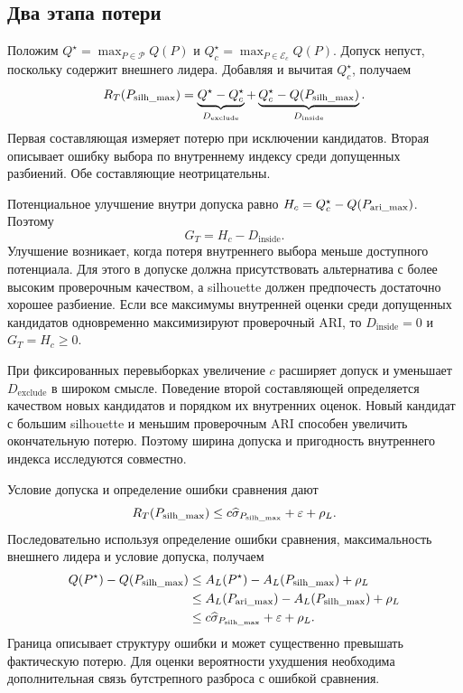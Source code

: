 \subsection{Два этапа потери}
Положим $Q^\star=\max_{P\in\mathcal P}Q(P)$ и $Q_c^\star=\max_{P\in\mathcal E_c}Q(P)$. Допуск непуст, поскольку содержит внешнего лидера. Добавляя и вычитая $Q_c^\star$, получаем
\begin{equation}\label{eq:regret-decomposition}
 R_T(P_{\mathrm{silh\_max}})=
 \underbrace{Q^\star-Q_c^\star}_{D_{\mathrm{exclude}}}
 +\underbrace{Q_c^\star-Q(P_{\mathrm{silh\_max}})}_{D_{\mathrm{inside}}}.
\end{equation}
Первая составляющая измеряет потерю при исключении кандидатов. Вторая описывает ошибку выбора по внутреннему индексу среди допущенных разбиений. Обе составляющие неотрицательны.

Потенциальное улучшение внутри допуска равно $H_c=Q_c^\star-Q(P_{\mathrm{ari\_max}})$. Поэтому
\begin{equation}\label{eq:gain-decomposition}
 G_T=H_c-D_{\mathrm{inside}}.
\end{equation}
Улучшение возникает, когда потеря внутреннего выбора меньше доступного потенциала. Для этого в допуске должна присутствовать альтернатива с более высоким проверочным качеством, а silhouette должен предпочесть достаточно хорошее разбиение. Если все максимумы внутренней оценки среди допущенных кандидатов одновременно максимизируют проверочный ARI, то $D_{\mathrm{inside}}=0$ и $G_T=H_c\ge0$.

При фиксированных перевыборках увеличение $c$ расширяет допуск и уменьшает $D_{\mathrm{exclude}}$ в широком смысле. Поведение второй составляющей определяется качеством новых кандидатов и порядком их внутренних оценок. Новый кандидат с большим silhouette и меньшим проверочным ARI способен увеличить окончательную потерю. Поэтому ширина допуска и пригодность внутреннего индекса исследуются совместно.

Условие допуска и определение ошибки сравнения дают
\begin{equation}\label{eq:adaptive-bound}
 R_T(P_{\mathrm{silh\_max}})\le c\widehat\sigma_{P_{\mathrm{silh\_max}}}+\varepsilon+\rho_L.
\end{equation}
Последовательно используя определение ошибки сравнения, максимальность внешнего лидера и условие допуска, получаем
\begin{align*}
 Q(P^\star)-Q(P_{\mathrm{silh\_max}})
 &\le A_L(P^\star)-A_L(P_{\mathrm{silh\_max}})+\rho_L\\
 &\le A_L(P_{\mathrm{ari\_max}})-A_L(P_{\mathrm{silh\_max}})+\rho_L\\
 &\le c\widehat\sigma_{P_{\mathrm{silh\_max}}}+\varepsilon+\rho_L.
\end{align*}
Граница описывает структуру ошибки и может существенно превышать фактическую потерю. Для оценки вероятности ухудшения необходима дополнительная связь бутстрепного разброса с ошибкой сравнения.

